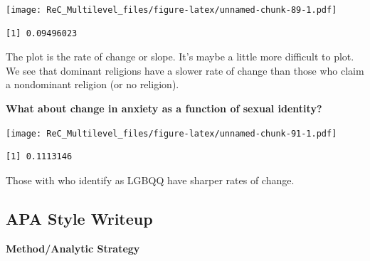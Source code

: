 \documentclass[
  11pt,
]{book}
\newenvironment{Shaded}{\begin{snugshade}}{\end{snugshade}}
\newcommand{\AttributeTok}[1]{\textcolor[rgb]{0.77,0.63,0.00}{#1}}
\newcommand{\FunctionTok}[1]{\textcolor[rgb]{0.00,0.00,0.00}{#1}}
\newcommand{\NormalTok}[1]{#1}
\newcommand{\SpecialCharTok}[1]{\textcolor[rgb]{0.00,0.00,0.00}{#1}}
\newcommand{\StringTok}[1]{\textcolor[rgb]{0.31,0.60,0.02}{#1}}
\begin{document}
\texttt{[image: ReC\_Multilevel\_files/figure-latex/unnamed-chunk-89-1.pdf]}

\begin{Shaded}
\end{Shaded}

\begin{verbatim}
[1] 0.09496023
\end{verbatim}

The plot is the rate of change or slope. It's maybe a little more difficult to plot. We see that dominant religions have a slower rate of change than those who claim a nondominant religion (or no religion).

\textbf{What about change in anxiety as a function of sexual identity?}

\begin{Shaded}
\end{Shaded}

\texttt{[image: ReC\_Multilevel\_files/figure-latex/unnamed-chunk-91-1.pdf]}

\begin{Shaded}
\end{Shaded}

\begin{verbatim}
[1] 0.1113146
\end{verbatim}

Those with who identify as LGBQQ have sharper rates of change.

\hypertarget{apa-style-writeup-1}{%
\subsection{APA Style Writeup}\label{apa-style-writeup-1}}

\textbf{Method/Analytic Strategy}
\end{document}
